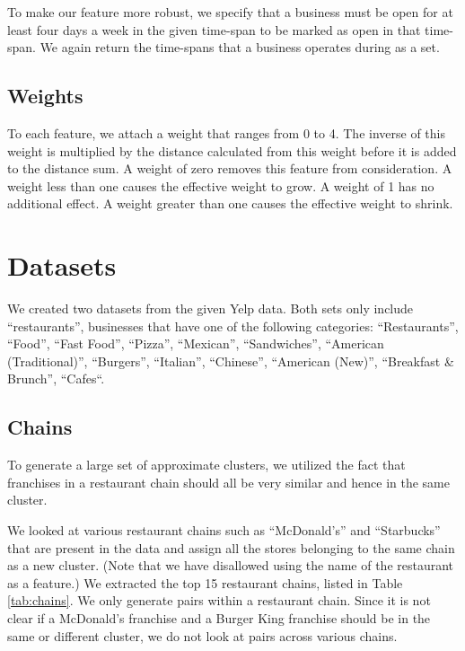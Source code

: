 \documentclass{article}
\begin{document}
\begin{itemize}
\begin{itemize}
            To make our feature more robust, we specify that a business must be open for at least four days a week in the given time-span to be marked as open in that time-span.
            We again return the time-spans that a business operates during as a set.
      
      \end{itemize}
   \end{itemize}

   \subsection{Weights}
      To each feature, we attach a weight that ranges from 0 to 4.
      The inverse of this weight is multiplied by the distance calculated from this weight before it is added to the distance sum.
      A weight of zero removes this feature from consideration.
      A weight less than one causes the effective weight to grow.
      A weight of 1 has no additional effect.
      A weight greater than one causes the effective weight to shrink.

\section{Datasets}
   We created two datasets from the given Yelp data.
   Both sets only include ``restaurants'', businesses that have one of the following categories:
   ``Restaurants'', ``Food'', ``Fast Food'', ``Pizza'', ``Mexican'', ``Sandwiches'', ``American (Traditional)'', ``Burgers'', ``Italian'', ``Chinese'', ``American (New)'', ``Breakfast \& Brunch'', ``Cafes``.

   \subsection{Chains}
      To generate a large set of approximate clusters, we utilized the fact that franchises in a restaurant chain should all be very similar and hence in the same cluster.

      We looked at various restaurant chains such as ``McDonald's'' and ``Starbucks'' that are present in the data and assign all the stores belonging to the same chain as a new cluster.
      (Note that we have disallowed using the name of the restaurant as a feature.)
      We extracted the top 15 restaurant chains, listed in Table \ref{tab:chains}.
      We only generate pairs within a restaurant chain.
      Since it is not clear if a McDonald's franchise and a Burger King franchise should be in the same or different cluster, we do not look at pairs across various chains.
\end{document}
